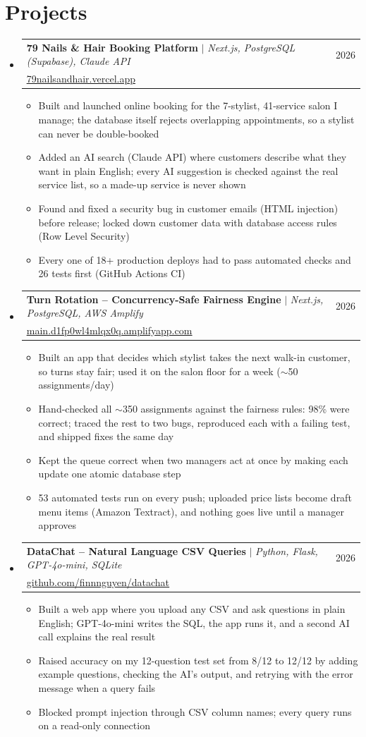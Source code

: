 \documentclass[letterpaper,11pt]{article}
\makeatletter
\newcommand{\resumeItem}[1]{
  \item\small{
    {#1 \vspace{-2pt}}
  }
}
\newcommand{\resumeProjectHeadingLink}[3]{
    \item
    \begin{tabular*}{0.97\textwidth}{l@{\extracolsep{\fill}}r}
      \small#1 & #2 \\
      \small#3 & \\
    \end{tabular*}\vspace{-7pt}
}
\newcommand{\resumeSubHeadingListStart}{\begin{itemize}[leftmargin=0.15in, label={}]}
\newcommand{\resumeSubHeadingListEnd}{\end{itemize}}
\newcommand{\resumeItemListStart}{\begin{itemize}}
\newcommand{\resumeItemListEnd}{\end{itemize}\vspace{-5pt}}
\makeatother
\begin{document}
\section{Projects}
    \resumeSubHeadingListStart
      \resumeProjectHeadingLink
          {\textbf{79 Nails \& Hair Booking Platform} $|$ \emph{Next.js, PostgreSQL (Supabase), Claude API}}{2026}
          {\href{https://79nailsandhair.vercel.app}{\underline{79nailsandhair.vercel.app}}}
          \resumeItemListStart
            \resumeItem{Built and launched online booking for the 7-stylist, 41-service salon I manage; the database itself rejects overlapping appointments, so a stylist can never be double-booked}
            \resumeItem{Added an AI search (Claude API) where customers describe what they want in plain English; every AI suggestion is checked against the real service list, so a made-up service is never shown}
            \resumeItem{Found and fixed a security bug in customer emails (HTML injection) before release; locked down customer data with database access rules (Row Level Security)}
            \resumeItem{Every one of 18+ production deploys had to pass automated checks and 26 tests first (GitHub Actions CI)}
          \resumeItemListEnd
      \resumeProjectHeadingLink
          {\textbf{Turn Rotation -- Concurrency-Safe Fairness Engine} $|$ \emph{Next.js, PostgreSQL, AWS Amplify}}{2026}
          {\href{https://main.d1fp0wl4mlqx0q.amplifyapp.com}{\underline{main.d1fp0wl4mlqx0q.amplifyapp.com}}}
          \resumeItemListStart
            \resumeItem{Built an app that decides which stylist takes the next walk-in customer, so turns stay fair; used it on the salon floor for a week ($\sim$50 assignments/day)}
            \resumeItem{Hand-checked all $\sim$350 assignments against the fairness rules: 98\% were correct; traced the rest to two bugs, reproduced each with a failing test, and shipped fixes the same day}
            \resumeItem{Kept the queue correct when two managers act at once by making each update one atomic database step}
            \resumeItem{53 automated tests run on every push; uploaded price lists become draft menu items (Amazon Textract), and nothing goes live until a manager approves}
          \resumeItemListEnd
      \resumeProjectHeadingLink
          {\textbf{DataChat -- Natural Language CSV Queries} $|$ \emph{Python, Flask, GPT-4o-mini, SQLite}}{2026}
          {\href{https://github.com/finnnguyen/datachat}{\underline{github.com/finnnguyen/datachat}}}
          \resumeItemListStart
            \resumeItem{Built a web app where you upload any CSV and ask questions in plain English; GPT-4o-mini writes the SQL, the app runs it, and a second AI call explains the real result}
            \resumeItem{Raised accuracy on my 12-question test set from 8/12 to 12/12 by adding example questions, checking the AI's output, and retrying with the error message when a query fails}
            \resumeItem{Blocked prompt injection through CSV column names; every query runs on a read-only connection}
          \resumeItemListEnd
    \resumeSubHeadingListEnd
\end{document}
